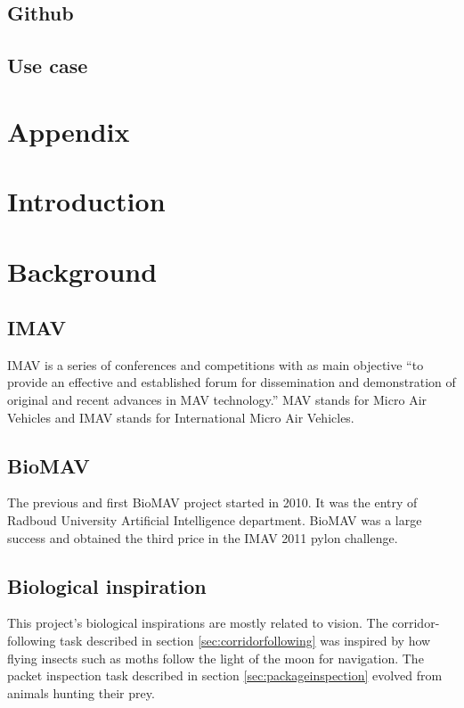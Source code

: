 \documentclass[a4paper,10pt]{article}
\begin{document}
\subsection{Github}
\subsection{Use case}

\section{Appendix}

\section{Introduction}
\section{Background}
\label{sec:background}
\subsection{IMAV}
IMAV is a series of conferences and competitions with as main objective
``to provide an effective and established forum for dissemination and
demonstration of original and recent advances in MAV technology.''\cite{imav}
MAV stands for Micro Air Vehicles and IMAV stands for International
Micro Air Vehicles.

\subsection{BioMAV}
The previous and first BioMAV project started in 2010. It was the entry
of Radboud University Artificial Intelligence department. BioMAV was a large
success and obtained the third price in the IMAV 2011 pylon challenge.

\subsection{Biological inspiration}
This project's biological inspirations are mostly related to vision. The
corridor-following task described in section \ref{sec:corridorfollowing} was inspired by how flying insects such as moths
follow the light of the moon for navigation. The packet inspection task described in section \ref{sec:packageinspection}
evolved from animals hunting their prey.
\end{document}
